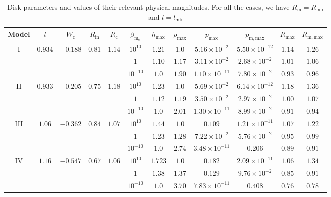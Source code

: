 \documentclass[twocolumn,aps,showpacs,showkeys,prd,superscriptaddress,byrevtex, amsmath]{revtex4-1}
\begin{document}
\begin{table}
\caption{Disk parameters and values of their relevant physical magnitudes. For all the cases, we have $R_{\mathrm{in}} = R_{\mathrm{mb}}$ and $l = l_{\mathrm{mb}}$}        
\label{HBH_disk_parameters}      
\centering          
\begin{tabular}{c c c c c  c c c c c c c}
\hline\hline       
 Model & $l$ & $W_{\mathrm{c}}$ & $R_{\mathrm{in}}$ & $R_{\mathrm{c}}$ &  $\beta_{\mathrm{m_{\mathrm{c}}}}$ & $h_{\mathrm{max}}$ & $\rho_{\mathrm{max}}$ & $p_{\mathrm{max}}$ & $p_{\mathrm{m, max}}$ & $R_{\mathrm{max}}$ & $R_{\mathrm{m, max}}$\\ 
\hline           
I & $0.934$ & $-0.188$ & $0.81$ & $1.14$ & $10^{10}$ & $1.21$ & $1.0$ & $5.16 \times 10^{-2}$ & $5.50 \times 10^{-12}$ & $1.14$ & $1.26$\\ 
 \hline 
 &  &  &  &  & $1$ & $1.10$ & $1.17$ & $3.11 \times 10^{-2}$ & $2.68 \times 10^{-2}$ & $1.01$ & $1.06$\\ 
 \hline 
 &  &  &  &  & $10^{-10}$ & $1.0$ & $1.90$ & $1.10 \times 10^{-11}$ & $7.80 \times 10^{-2}$ & $0.93$ & $0.96$\\ 
 \hline 
II & $0.933$ & $-0.205$ & $0.75$ & $1.18$ & $10^{10}$ & $1.23$ & $1.0$ & $5.69 \times 10^{-2}$ & $6.14 \times 10^{-12}$ & $1.18$ & $1.36$\\ 
 \hline 
 &  &  &  &  & $1$ & $1.12$ & $1.19$ & $3.50 \times 10^{-2}$ & $2.97 \times 10^{-2}$ & $1.00$ & $1.07$\\ 
 \hline 
 &  &  &  &  & $10^{-10}$ & $1.0$ & $2.01$ & $1.30 \times 10^{-11}$ & $8.99 \times 10^{-2}$ & $0.91$ & $0.94$ \\ 
 \hline 
III & $1.06$ & $-0.362$ & $0.84$ & $1.07$ & $10^{10}$ & $1.44$ & $1.0$ & $0.109$ & $1.21 \times 10^{-11}$ & $1.07$ & $1.22$\\ 
 \hline 
 &  &  &  &  & $1$ & $1.23$ & $1.28$ & $7.22 \times 10^{-2}$ & $5.76 \times 10^{-2}$ & $0.95$ & $0.99$ \\ 
 \hline 
 &  &  &  &  & $10^{-10}$ & $1.0$ & $2.74$ & $3.48 \times 10^{-11}$ & $0.206$ & $0.89$ & $0.91$\\ 
\hline  
IV & $1.16$ & $-0.547$ & $0.67$ & $1.06$ & $10^{10}$ & $1.723$ & $1.0$ & $0.182$ & $2.09 \times 10^{-11}$ & $1.06$ & $1.34$ \\ 
\hline 
 &  &  &  &  & $1$ & $1.38$ & $1.37$ & $0.129$ & $9.76 \times 10^{-2}$ & $0.85$ & $0.91$\\ 
\hline 
 &  &  &  &  & $10^{-10}$ & $1.0$ & $3.70$ & $7.83 \times 10^{-11}$ & $0.408$ & $0.76$ & $0.78$ \\ 

\end{tabular}
\end{table}
\end{document}
